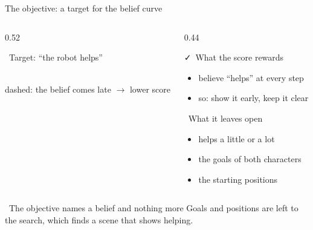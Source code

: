 \documentclass[aspectratio=169,10pt]{beamer}
\newcommand{\robot}[1]{\textcolor{robotBlue}{#1}}
\newcommand{\tightitem}{\itemsep0.3em}
\newcommand{\slideendspace}{\vspace{0.3em}}
\begin{document}
\begin{frame}{The objective: a target for the belief curve}
\begin{columns}[T,onlytextwidth]

\begin{column}{0.52\textwidth}
\begin{block}{\faBullseye\ Target: ``the robot helps''}
\centering
{}\\[0.1em]
{\scriptsize\color{gray}dashed: the belief comes late $\to$ lower score}
\end{block}
\end{column}

\begin{column}{0.44\textwidth}
\begin{block}{\faCheck\ What the score rewards}
\begin{itemize}\tightitem
  \item believe ``helps'' at \alert{every} step
  \item so: show it early, keep it clear
\end{itemize}
\end{block}
\begin{block}{\faTimes\ What it leaves open}
\begin{itemize}\tightitem
  \item helps a little or a lot
  \item the goals of both characters
  \item the starting positions
\end{itemize}
\end{block}
\end{column}

\end{columns}

\slideendspace
\begin{alertblock}{\faLightbulb\ The objective names a belief and nothing more}
Goals and positions are left to the search, which finds a scene that \alert{shows} helping.
\end{alertblock}
\end{frame}
\end{document}

